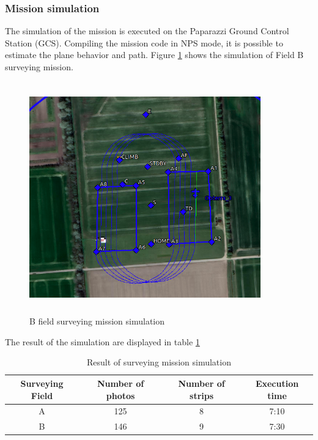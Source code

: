 \subsubsection{Mission simulation}
The simulation of the mission is executed on the Paparazzi Ground Control Station (GCS). Compiling the mission code in NPS mode, it is possible to estimate the plane behavior and path. Figure \ref{fig:bsim} shows the simulation of Field B surveying mission.
\begin{figure}[H]
\centering
\includegraphics[width=10cm,height=10cm,keepaspectratio]{imagenes/SimBField.png}
\caption{B field surveying mission simulation}
\label{fig:bsim}
\end{figure}
The result of the simulation are displayed in table \ref{Table:SimResult}
\begin{table}[H]
\centering
\begin{tabular}{|c|c|c|c|}
\hline
Surveying Field & Number of photos & Number of strips & Execution time \\ \hline
A               & 125              & 8                & 7:10           \\ \hline
B               & 146              & 9                & 7:30           \\ \hline
\end{tabular}
\caption{Result of surveying mission simulation}
\label{Table:SimResult}
\end{table}

